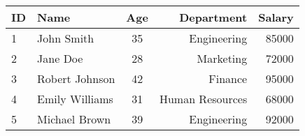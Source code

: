 \begin{tabular}{|l|l|c|r|r|}
\hline
ID & Name & Age & Department & Salary \\
\hline
1 & John Smith & 35 & Engineering & 85000 \\
\hline
2 & Jane Doe & 28 & Marketing & 72000 \\
\hline
3 & Robert Johnson & 42 & Finance & 95000 \\
\hline
4 & Emily Williams & 31 & Human Resources & 68000 \\
\hline
5 & Michael Brown & 39 & Engineering & 92000 \\
\hline
\end{tabular}
